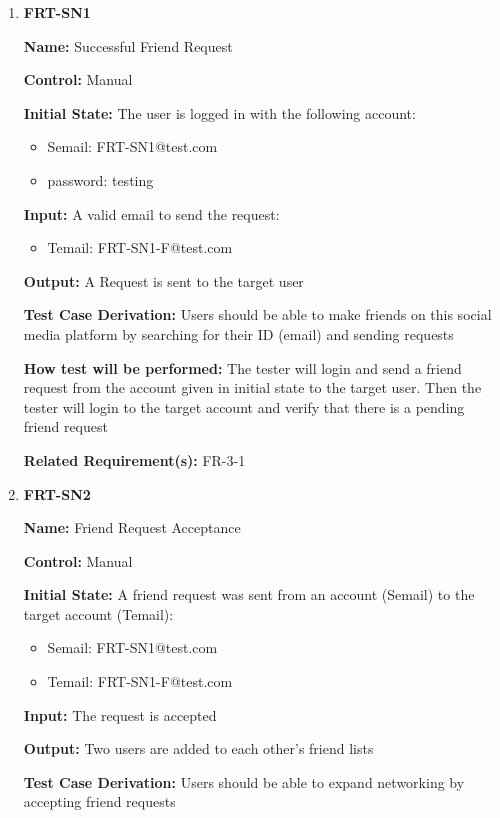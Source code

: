 \documentclass[12pt, titlepage]{article}
\begin{document}
\begin{enumerate}
\item{\textbf{FRT-SN1}}

\textbf{Name:} Successful Friend Request

\textbf{Control:} Manual
					
\textbf{Initial State:} The user is logged in with the following account:
\begin{itemize}
\item Semail: FRT-SN1@test.com
\item password: testing
\end{itemize}

\textbf{Input:} A valid email to send the request:
\begin{itemize}
\item Temail: FRT-SN1-F@test.com
\end{itemize}
					
\textbf{Output:} A Request is sent to the target user

\textbf{Test Case Derivation:} Users should be able to make friends on this social media platform by searching for their ID (email) and sending requests
					
\textbf{How test will be performed:} The tester will login and send a friend request from the account given in initial state to the target user. Then the tester will login to the target account and verify that there is a pending friend request

\textbf{Related Requirement(s):} FR-3-1

\item{\textbf{FRT-SN2}}

\textbf{Name:} Friend Request Acceptance

\textbf{Control:} Manual
					
\textbf{Initial State:} A friend request was sent from an account (Semail) to the target account (Temail):
\begin{itemize}
\item Semail: FRT-SN1@test.com
\item Temail: FRT-SN1-F@test.com
\end{itemize}

\textbf{Input:} The request is accepted
					
\textbf{Output:} Two users are added to each other's friend lists

\textbf{Test Case Derivation:} Users should be able to expand networking by accepting friend requests
					

\end{enumerate}
\end{document}
